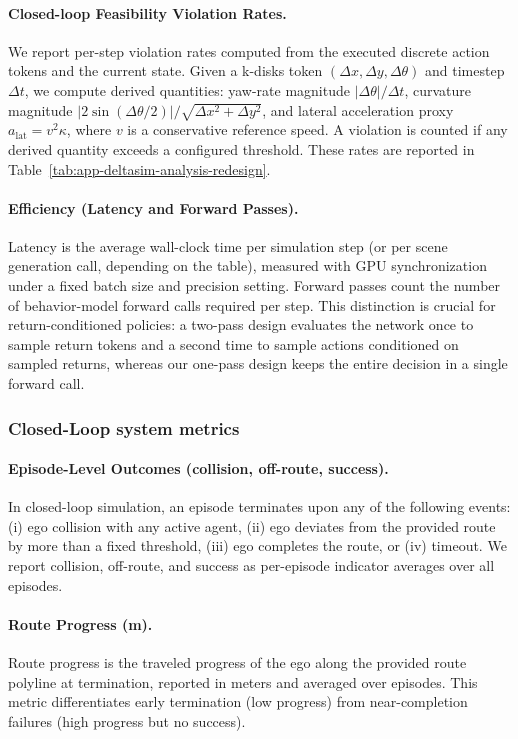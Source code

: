 \documentclass{article}
\theoremstyle{plain}
\theoremstyle{definition}
\theoremstyle{remark}
\begin{document}
\paragraph{Closed-loop Feasibility Violation Rates.}
We report per-step violation rates computed from the executed discrete action tokens and the current state.
Given a k-disks token \((\Delta x,\Delta y,\Delta\theta)\) and timestep \(\Delta t\), we compute derived quantities:
yaw-rate magnitude \(|\Delta\theta|/\Delta t\), curvature magnitude \(\big|2\sin(\Delta\theta/2)\big|/\sqrt{\Delta x^{2}+\Delta y^{2}}\),
and lateral acceleration proxy \(a_{\mathrm{lat}}=v^{2}\kappa\), where \(v\) is a conservative reference speed.
A violation is counted if any derived quantity exceeds a configured threshold.
These rates are reported in Table~\ref{tab:app-deltasim-analysis-redesign}.

\paragraph{Efficiency (Latency and Forward Passes).}
Latency is the average wall-clock time per simulation step (or per scene generation call, depending on the table), measured with GPU
synchronization under a fixed batch size and precision setting.
Forward passes count the number of behavior-model forward calls required per step.
This distinction is crucial for return-conditioned policies: a two-pass design evaluates the network once to sample return tokens and a
second time to sample actions conditioned on sampled returns, whereas our one-pass design keeps the entire decision in a single forward call.

\subsubsection{Closed-Loop system metrics}

\paragraph{Episode-Level Outcomes (collision, off-route, success).}
In closed-loop simulation, an episode terminates upon any of the following events:
(i) ego collision with any active agent, (ii) ego deviates from the provided route by more than a fixed threshold, (iii) ego completes
the route, or (iv) timeout.
We report collision, off-route, and success as per-episode indicator averages over all episodes.

\paragraph{Route Progress (m).}
Route progress is the traveled progress of the ego along the provided route polyline at termination, reported in meters and averaged over episodes.
This metric differentiates early termination (low progress) from near-completion failures (high progress but no success).
\end{document}
